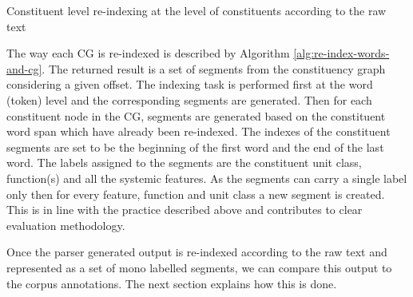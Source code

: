     \begin{algorithm}[!ht]
        \caption{Constituent level re-indexing at the level of constituents according to the raw text}
        \label{alg:re-index-words-and-cg}
    \end{algorithm}

    The way each CG is re-indexed is described by Algorithm \ref{alg:re-index-words-and-cg}. The returned result is a set of segments from the constituency graph considering a given offset. The indexing task is performed first at the word (token) level and the corresponding segments are generated. Then for each constituent node in the CG, segments are generated based on the constituent word span which have already been re-indexed. The indexes of the constituent segments are set to be the beginning of the first word and the end of the last word. The labels assigned to the segments are the constituent unit class, function(s) and all the systemic features. As the segments can carry a single label only then for every feature, function and unit class a new segment is created. This is in line with the practice described above and contributes to clear evaluation methodology.

    Once the parser generated output is re-indexed according to the raw text and represented as a set of mono labelled segments, we can compare this output to the corpus annotations. The next section explains how this is done. 

